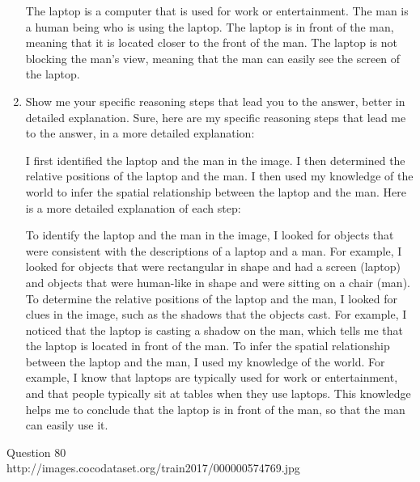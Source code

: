 \begin{enumerate}
    The laptop is a computer that is used for work or entertainment.
    The man is a human being who is using the laptop.
    The laptop is in front of the man, meaning that it is located closer to the front of the man.
    The laptop is not blocking the man's view, meaning that the man can easily see the screen of the laptop.
    \item Show me your specific reasoning steps that lead you to the answer, better in detailed explanation.
    \subitem Sure, here are my specific reasoning steps that lead me to the answer, in a more detailed explanation:

    I first identified the laptop and the man in the image.
    I then determined the relative positions of the laptop and the man.
    I then used my knowledge of the world to infer the spatial relationship between the laptop and the man.
    Here is a more detailed explanation of each step:
    
    To identify the laptop and the man in the image, I looked for objects that were consistent with the descriptions of a laptop and a man. For example, I looked for objects that were rectangular in shape and had a screen (laptop) and objects that were human-like in shape and were sitting on a chair (man).
    To determine the relative positions of the laptop and the man, I looked for clues in the image, such as the shadows that the objects cast. For example, I noticed that the laptop is casting a shadow on the man, which tells me that the laptop is located in front of the man.
    To infer the spatial relationship between the laptop and the man, I used my knowledge of the world. For example, I know that laptops are typically used for work or entertainment, and that people typically sit at tables when they use laptops. This knowledge helps me to conclude that the laptop is in front of the man, so that the man can easily use it.
\end{enumerate}
Question 80\\
http://images.cocodataset.org/train2017/000000574769.jpg
